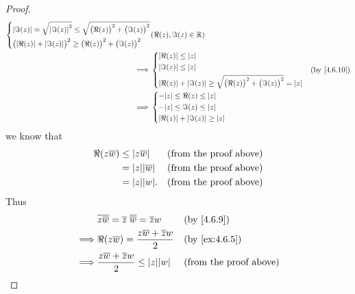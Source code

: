 \begin{proof}
\begin{align*}
\begin{dcases}
                 \abs{\Im(z)} = \sqrt{\abs{\Im(z)}^2} \leq \sqrt{\big(\Re(z)\big)^2 + \big(\Im(z)\big)^2} \\
                 \big(\abs{\Re(z)} + \abs{\Im(z)}\big)^2 \geq \big(\Re(z)\big)^2 + \big(\Im(z)\big)^2
               \end{dcases} & (\Re(z), \Im(z) \in \R) \\
    \implies & \begin{dcases}
                 \abs{\Re(z)} \leq \abs{z} \\
                 \abs{\Im(z)} \leq \abs{z} \\
                 \abs{\Re(z)} + \abs{\Im(z)} \geq \sqrt{\big(\Re(z)\big)^2 + \big(\Im(z)\big)^2} = \abs{z}
               \end{dcases}                                                    &                         & \text{(by \cref{4.6.10})}                       \\
    \implies & \begin{dcases}
                 -\abs{z} \leq \Re(z) \leq \abs{z} \\
                 -\abs{z} \leq \Im(z) \leq \abs{z} \\
                 \abs{\Re(z)} + \abs{\Im(z)} \geq \abs{z}
               \end{dcases}
  \end{align*}
  we know that
  \begin{align*}
    \Re(z \overline{w}) & \leq \abs{z \overline{w}}    &  & \text{(from the proof above)} \\
                        & = \abs{z} \abs{\overline{w}} &  & \text{(from the proof above)} \\
                        & = \abs{z} \abs{w}.           &  & \text{(from the proof above)}
  \end{align*}
  Thus
  \begin{align*}
             & \overline{z \overline{w}} = \overline{z} \; \overline{\overline{w}} = \overline{z} w                   &                                        & \text{(by \cref{4.6.9})}      \\
    \implies & \Re(z \overline{w}) = \dfrac{z \overline{w} + \overline{z} w}{2}                                       &                                        & \text{(by \cref{ex:4.6.5})}   \\
    \implies & \dfrac{z \overline{w} + \overline{z} w}{2} \leq \abs{z} \abs{w}                                        &                                        & \text{(from the proof above)} \\

\end{align*}
\end{proof}
